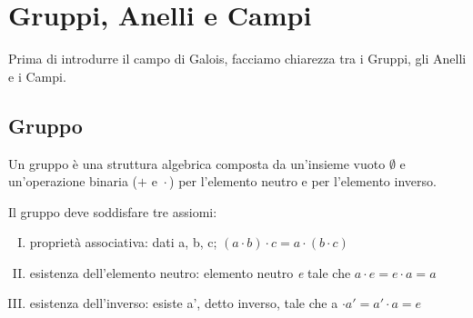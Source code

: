 \section{Gruppi, Anelli e Campi} %

\textsf{\small Prima di introdurre il campo di Galois, facciamo chiarezza tra i Gruppi, gli Anelli e i Campi.}



\subsection{Gruppo}

\textsf{\small Un gruppo è una struttura algebrica composta da un'insieme vuoto $\emptyset$ e un'operazione binaria ($+ \text{ e } \cdot$) per l'elemento neutro e per l'elemento inverso.}

\textsf{\small Il gruppo deve soddisfare tre assiomi:}

\begin{enumerate}[I.] %
	\item \textsf{\small proprietà associativa: dati a, b, c;  $(a \cdot b) \cdot c = a \cdot (b \cdot c)$}
	\item \textsf{\small esistenza dell'elemento neutro: elemento neutro \emph{e} tale che $a \cdot e = e \cdot a = a$}
	\item \textsf{\small esistenza dell'inverso: esiste a', detto inverso, tale che a $\cdot a' = a' \cdot a = e$}
\end{enumerate}

